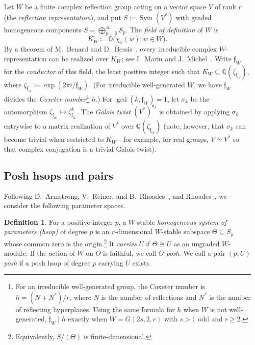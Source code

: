 \documentclass[11pt]{amsart}
\newcommand{\defeq}{\coloneqq}
\newcommand{\defn}[1]{\emph{\color{darkblue}#1}}
\theoremstyle{definition}
\newtheorem{definition}[theorem]{Definition}
\DeclareMathOperator{\Sym}{Sym}\DeclareMathOperator{\Hom}{Hom}
\begin{document}
Let $W$ be a finite complex reflection group acting on a vector space
$V$ of rank $r$ (the \defn{reflection representation}), and put $S\defeq \Sym(V^*)$ with graded homogeneous components $S=\bigoplus_{p=0}^\infty S_p$.  The \defn{field of definition} of $W$ is
\[
 K_W\defeq \mathbb{Q}\bigl(\chi_V(w):w\in W\bigr).
\]
By a theorem of M.~Benard and D.~Bessis~\cite{Benard,BessisField}, every irreducible complex
$W$-representation can be realized over $K_W$; see I.~Marin and J.~Michel~\cite[Introduction]{MarinMichel}.
Write $\mathfrak f_W$ for the \defn{conductor} of this field, the least
positive integer such that $K_W\subseteq\mathbb{Q}(\zeta_{\mathfrak f_W})$,
where $\zeta_{\mathfrak f_W}\defeq\exp(2\pi i/\mathfrak f_W)$.  (For irreducible well-generated $W$, we have $\mathfrak f_W$ divides the \defn{Coxeter number}\footnote{For an irreducible well-generated group, the Coxeter number is $h=(N+N^*)/r$, where $N$ is the number of reflections and $N^*$ is the number of reflecting hyperplanes. Using the same formula for $h$ when $W$ is not well-generated, $\mathfrak f_W\mid h$ exactly when $W=G(2s,2,r)$ with $s>1$ odd and $r\geq2$.} $h$.)  For $\gcd(k,\mathfrak f_W)=1$, let $\sigma_k$ be the automorphism
$\zeta_{\mathfrak f_W}\mapsto\zeta_{\mathfrak f_W}^k$.
The \defn{Galois twist} $(V^*)^{\sigma_k}$ is obtained by applying
$\sigma_k$ entrywise to a matrix realization of $V^*$ over $\mathbb{Q}(\zeta_{\mathfrak f_W})$ (note, however, that $\sigma_k$ can become trivial when restricted to $K_W$---for example, for real groups, $V\simeq V^*$ so that complex conjugation is a trivial Galois twist).

\subsection{Posh hsops and pairs}

Following D.~Armstrong, V.~Reiner, and B.~Rhoades~\cite{ARR}, and
Rhoades~\cite{RhoadesFuss}, we consider the following parameter spaces.
\begin{definition}
For a positive integer $p$, a $W$-stable \defn{homogeneous system of
parameters (hsop)} of degree $p$ is an $r$-dimensional $W$-stable
subspace $\Theta\subseteq S_p$ whose common zero is the origin.\footnote{Equivalently, $S/(\Theta)$ is finite-dimensional.}
It \defn{carries} $U$ if $\Theta\cong U$ as an ungraded $W$-module.
If the action of $W$ on $\Theta$ is faithful, we call $\Theta$
\defn{posh}. We call a pair $(p,U)$ \defn{posh} if a
posh hsop of degree $p$ carrying $U$ exists.
\label{def:parking_hsop}
\label{def:posh}
\end{definition}
\end{document}
